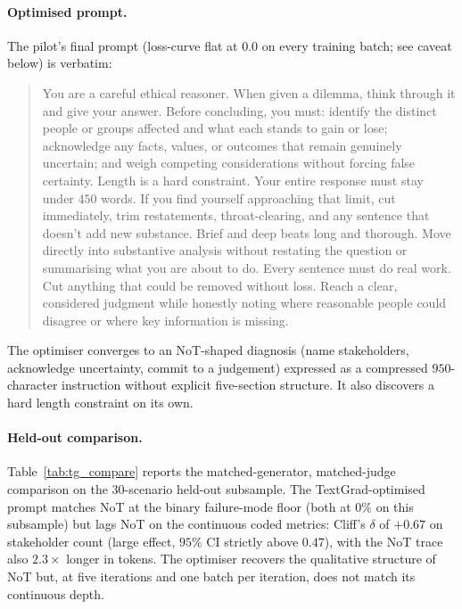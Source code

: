 \documentclass[11pt]{article}
\begin{document}
\paragraph{Optimised prompt.} The pilot's final prompt
(loss-curve flat at $0.0$ on every training batch; see caveat
below) is verbatim:
\begin{quote}\small
You are a careful ethical reasoner. When given a dilemma, think
through it and give your answer. Before concluding, you must:
identify the distinct people or groups affected and what each
stands to gain or lose; acknowledge any facts, values, or
outcomes that remain genuinely uncertain; and weigh competing
considerations without forcing false certainty. Length is a hard
constraint. Your entire response must stay under $450$ words. If
you find yourself approaching that limit, cut immediately, trim
restatements, throat-clearing, and any sentence that doesn't add
new substance. Brief and deep beats long and thorough. Move
directly into substantive analysis without restating the
question or summarising what you are about to do. Every sentence
must do real work. Cut anything that could be removed without
loss. Reach a clear, considered judgment while honestly noting
where reasonable people could disagree or where key information
is missing.
\end{quote}
The optimiser converges to an NoT-shaped diagnosis (name
stakeholders, acknowledge uncertainty, commit to a judgement)
expressed as a compressed $950$-character instruction without
explicit five-section structure. It also discovers a hard
length constraint on its own.

\paragraph{Held-out comparison.} Table~\ref{tab:tg_compare}
reports the matched-generator, matched-judge comparison on the
$30$-scenario held-out subsample. The TextGrad-optimised prompt
matches NoT at the binary failure-mode floor (both at $0\%$ on
this subsample) but lags NoT on the continuous coded metrics:
Cliff's $\delta$ of $+0.67$ on stakeholder count (large effect,
$95\%$ CI strictly above $0.47$), with the NoT trace also
$2.3{\times}$ longer in tokens. The optimiser recovers the
qualitative structure of NoT but, at five iterations and one
batch per iteration, does not match its continuous depth.
\end{document}
